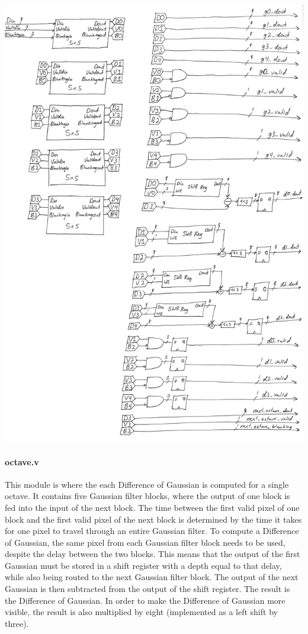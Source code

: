 \documentclass[12pt]{article}
\begin{document}
\includegraphics[width=\textwidth]{processed_image_pngs/octave.png}

\paragraph{octave.v}

This module is where the each Difference of Gaussian is computed for a single octave. It contains five Gaussian filter blocks, where the output of one block is fed into the input of the next block. The time between the first valid pixel of one block and the first valid pixel of the next block is determined by the time it takes for one pixel to travel through an entire Gaussian filter. To compute a Difference of Gaussian, the same pixel from each Gaussian filter block needs to be used, despite the delay between the two blocks. This means that the output of the first Gaussian must be stored in a shift register with a depth equal to that delay, while also being routed to the next Gaussian filter block. The output of the next Gaussian is then subtracted from the output of the shift register. The result is the Difference of Gaussian. In order to make the Difference of Gaussian more visible, the result is also multiplied by eight (implemented as a left shift by three).
\end{document}
